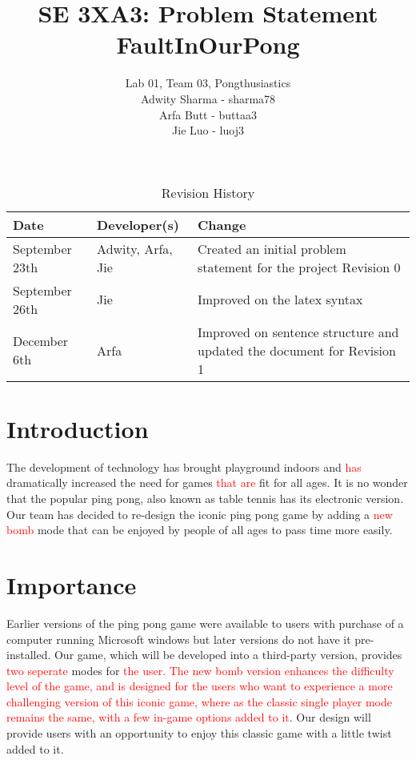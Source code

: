 \documentclass{article}
\title{SE 3XA3: Problem Statement\\FaultInOurPong}
\author{Lab 01, Team 03, Pongthusiastics
		\\ Adwity Sharma - sharma78
		\\ Arfa Butt - buttaa3
		\\ Jie Luo - luoj3
}
\date{}
\begin{document}
\begin{table}[hp]
\caption{Revision History} \label{TblRevisionHistory}
\begin{tabularx}{\textwidth}{llX}
\toprule
\textbf{Date} & \textbf{Developer(s)} & \textbf{Change}\\
\midrule
September 23th & Adwity, Arfa, Jie & Created an initial problem statement for
the project Revision 0\\
September 26th & Jie & Improved on the latex syntax\\
December 6th & Arfa & Improved on sentence structure and updated the document for Revision 1\\
\bottomrule
\end{tabularx}
\end{table}
\newpage
\maketitle
\section{Introduction}
The development of technology has brought playground indoors and \textcolor{red}{has} dramatically
increased the need for games \textcolor{red}{that are} fit for all ages. It is no wonder that the popular
ping pong, also known as table tennis has its electronic version. Our team has
decided to re-design the iconic ping pong game by adding a \textcolor{red}{new bomb} mode
that can be enjoyed by people of all ages to pass time more easily. 
\section{Importance}
Earlier versions of the ping pong game were available to users with purchase of
a computer running Microsoft windows but later versions do not have it
pre-installed. Our game, which will be developed into a third-party version,
provides \textcolor{red}{two seperate} modes for \textcolor{red}{the user. The new bomb version enhances
the difficulty level of the game, and is designed for the users who want to experience a more challenging version of this iconic game, 
where as the classic single player mode remains the same, with a few in-game options added to it}. 
Our design will provide users with an opportunity to enjoy this classic
game with a little twist added to it. 
\end{document}
